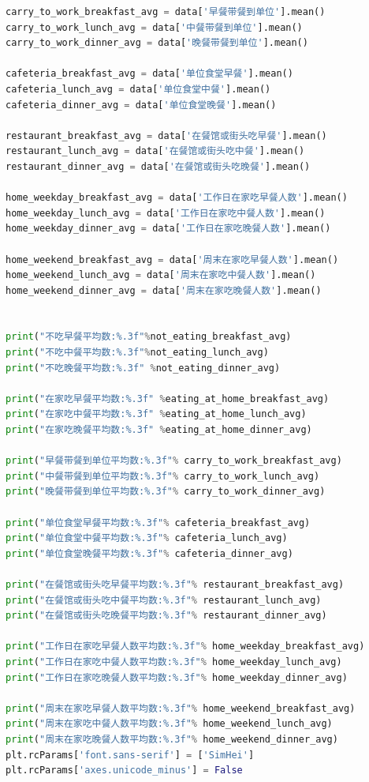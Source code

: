\documentclass[withoutpreface,bwprint]{cumcmthesis} %
\begin{document}
\begin{appendices}
\begin{lstlisting}[language=python]
carry_to_work_breakfast_avg = data['早餐带餐到单位'].mean()
carry_to_work_lunch_avg = data['中餐带餐到单位'].mean()
carry_to_work_dinner_avg = data['晚餐带餐到单位'].mean()

cafeteria_breakfast_avg = data['单位食堂早餐'].mean()
cafeteria_lunch_avg = data['单位食堂中餐'].mean()
cafeteria_dinner_avg = data['单位食堂晚餐'].mean()

restaurant_breakfast_avg = data['在餐馆或街头吃早餐'].mean()
restaurant_lunch_avg = data['在餐馆或街头吃中餐'].mean()
restaurant_dinner_avg = data['在餐馆或街头吃晚餐'].mean()

home_weekday_breakfast_avg = data['工作日在家吃早餐人数'].mean()
home_weekday_lunch_avg = data['工作日在家吃中餐人数'].mean()
home_weekday_dinner_avg = data['工作日在家吃晚餐人数'].mean()

home_weekend_breakfast_avg = data['周末在家吃早餐人数'].mean()
home_weekend_lunch_avg = data['周末在家吃中餐人数'].mean()
home_weekend_dinner_avg = data['周末在家吃晚餐人数'].mean()


print("不吃早餐平均数:%.3f"%not_eating_breakfast_avg)
print("不吃中餐平均数:%.3f"%not_eating_lunch_avg)
print("不吃晚餐平均数:%.3f" %not_eating_dinner_avg)

print("在家吃早餐平均数:%.3f" %eating_at_home_breakfast_avg)
print("在家吃中餐平均数:%.3f" %eating_at_home_lunch_avg)
print("在家吃晚餐平均数:%.3f" %eating_at_home_dinner_avg)

print("早餐带餐到单位平均数:%.3f"% carry_to_work_breakfast_avg)
print("中餐带餐到单位平均数:%.3f"% carry_to_work_lunch_avg)
print("晚餐带餐到单位平均数:%.3f"% carry_to_work_dinner_avg)

print("单位食堂早餐平均数:%.3f"% cafeteria_breakfast_avg)
print("单位食堂中餐平均数:%.3f"% cafeteria_lunch_avg)
print("单位食堂晚餐平均数:%.3f"% cafeteria_dinner_avg)

print("在餐馆或街头吃早餐平均数:%.3f"% restaurant_breakfast_avg)
print("在餐馆或街头吃中餐平均数:%.3f"% restaurant_lunch_avg)
print("在餐馆或街头吃晚餐平均数:%.3f"% restaurant_dinner_avg)

print("工作日在家吃早餐人数平均数:%.3f"% home_weekday_breakfast_avg)
print("工作日在家吃中餐人数平均数:%.3f"% home_weekday_lunch_avg)
print("工作日在家吃晚餐人数平均数:%.3f"% home_weekday_dinner_avg)

print("周末在家吃早餐人数平均数:%.3f"% home_weekend_breakfast_avg)
print("周末在家吃中餐人数平均数:%.3f"% home_weekend_lunch_avg)
print("周末在家吃晚餐人数平均数:%.3f"% home_weekend_dinner_avg)
plt.rcParams['font.sans-serif'] = ['SimHei']
plt.rcParams['axes.unicode_minus'] = False


\end{lstlisting}
\end{appendices}
\end{document}
